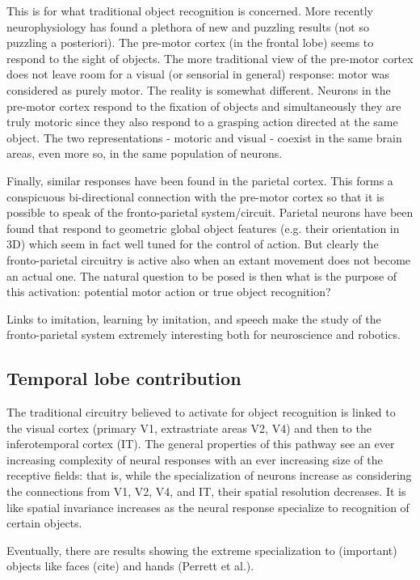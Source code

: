 This is for what traditional object recognition is concerned. More recently neurophysiology has found a plethora of new and puzzling results (not so puzzling a posteriori). The pre-motor cortex (in the frontal lobe) seems to respond to the sight of objects. The more traditional view of the pre-motor cortex does not leave room for a visual (or sensorial in general) response: motor was considered as purely motor. The reality is somewhat different. Neurons in the pre-motor cortex respond to the fixation of objects and simultaneously they are truly motoric since they also respond to a grasping action directed at the same object. The two representations - motoric and visual - coexist in the same brain areas, even more so, in the same population of neurons.

Finally, similar responses have been found in the parietal cortex. This forms a conspicuous bi-directional connection with the pre-motor cortex so that it is possible to speak of the fronto-parietal system/circuit. Parietal neurons have been found that respond to geometric global object features (e.g. their orientation in 3D) which seem in fact well tuned for the control of action. But clearly the fronto-parietal circuitry is active also when an extant movement does not become an actual one. The natural question to be posed is then what is the purpose of this activation: potential motor action or true object recognition?

Links to imitation, learning by imitation, and speech make the study of the fronto-parietal system extremely interesting both for neuroscience and robotics.

\subsection{Temporal lobe contribution}

The traditional circuitry believed to activate for object recognition is linked to the visual cortex (primary V1, extrastriate areas V2, V4) and then to the inferotemporal cortex (IT). The general properties of this pathway see an ever increasing complexity of neural responses with an ever increasing size of the receptive fields: that is, while the specialization of neurons increase as considering the connections from V1, V2, V4, and IT, their spatial resolution decreases. It is like spatial invariance increases as the neural response specialize to recognition of certain objects.

Eventually, there are results showing the extreme specialization to (important) objects like faces (cite) and hands (Perrett et al.).

